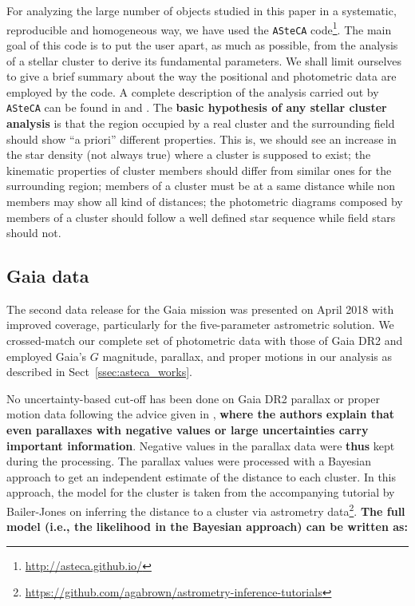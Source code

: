 \documentclass[referee]{aa}
\begin{document}
For analyzing the large number of objects studied in this paper in a
systematic, reproducible and homogeneous way, we have used the \texttt{ASteCA}
code\footnote{\url{http://asteca.github.io/}}. The main goal of this code is to
put the user apart, as much as possible, from the analysis of a stellar cluster
to derive its fundamental parameters. We shall limit ourselves to give a brief
summary about the way the positional and photometric data are employed by the
code. A complete description of the analysis carried out by
\texttt{ASteCA} can be found in \cite{Perren_2015} and \cite{Perren_2017}.
%
The \textbf{basic hypothesis of any stellar cluster analysis} is that the
region occupied by a real cluster and the surrounding field should show ``a
priori'' different properties.
This is, we should see an increase in the star density  (not always true) where
a cluster is supposed to exist; the kinematic properties of cluster members
should differ from similar ones for the surrounding region; members of a
cluster must be at a same distance while non members may show all kind of
distances; the photometric diagrams composed by members of a cluster should
follow a well defined star sequence while field stars should not. 



\subsection{Gaia data}
\label{ssec:gaia_data}

The second data release for the Gaia mission \citep{GaiaDR2_2018} was presented
on April 2018 with improved coverage, particularly for the five-parameter
astrometric solution.
We crossed-match our complete set of photometric data with those of Gaia DR2
and employed Gaia's $G$ magnitude, parallax, and proper motions in our
analysis as described in Sect~\ref{ssec:asteca_works}.

No uncertainty-based cut-off has been done on Gaia DR2 parallax or proper
motion data following the advice given in \cite{Luri_2018}, \textbf{where the
authors explain that even parallaxes with negative values or large
uncertainties carry important information}. Negative values in the parallax
data were \textbf{thus} kept during the processing. The parallax values
were processed with a Bayesian approach to get an independent estimate of the
distance to each cluster. In this approach, the model for the cluster is
taken from the accompanying tutorial by Bailer-Jones on inferring the distance
to a cluster via astrometry
data\footnote{
\url{https://github.com/agabrown/astrometry-inference-tutorials}}.
\textbf{The full model (i.e., the likelihood in the Bayesian approach) can be
written as:}
\end{document}
